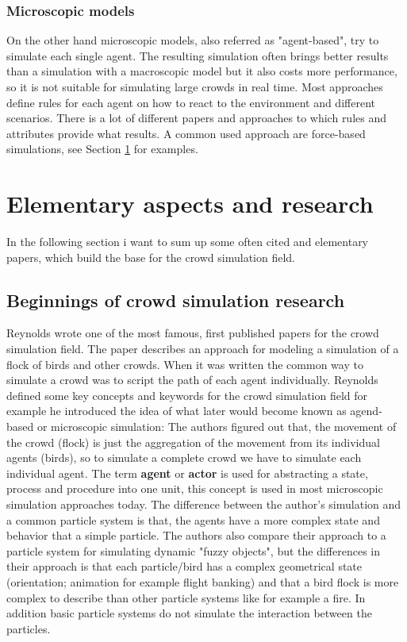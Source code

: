 \documentclass{acmsiggraph}               %
\begin{document}
\subsubsection{\textbf{Microscopic models}} \label{def:microscopic models}
On the other hand microscopic models, also referred as "agent-based"\cite{xu_crowd_2014}, try to simulate each single agent. The resulting simulation often brings better results than a simulation with a macroscopic model but it also costs more performance, so it is not suitable for simulating large crowds in real time. Most approaches define rules for each agent on how to react to the environment and different scenarios. There is a lot of different papers and approaches to which rules and attributes provide what results. A common used approach are force-based simulations, see Section \ref{chapter:elementaryPapers} for examples.

\section{Elementary aspects and research}
\label{chapter:elementaryPapers}
In the following section i want to sum up some often cited and elementary papers, which build the base for the crowd simulation field.
\subsection{Beginnings of crowd simulation research}

Reynolds  wrote one of the most famous, first published papers for the crowd simulation field. The paper describes an approach for modeling a simulation of a flock of birds and other crowds. When it was written the common way to simulate a crowd was to script the path of each agent individually. Reynolds defined some key concepts and keywords for the crowd simulation field for example he introduced the idea of what later would become known as agend-based or microscopic simulation: The authors figured out that, the movement of the crowd (flock) is just the aggregation of the movement from its individual agents (birds), so to simulate a complete crowd we have to simulate each individual agent.
The term \textbf{agent} or \textbf{actor} is used for abstracting a state, process and procedure into one unit, this concept is used in most microscopic simulation approaches today. The difference between the author's simulation and a common particle system is that, the agents have a more complex state and behavior that a simple particle.
The authors also compare their approach to a particle system for simulating dynamic "fuzzy objects", but the differences in their approach is that each particle/bird has a complex geometrical state (orientation; animation for example flight banking) and that a bird flock is more complex to describe than other particle systems like for example a fire. In addition basic particle systems do not simulate the interaction between the particles.
\end{document}
